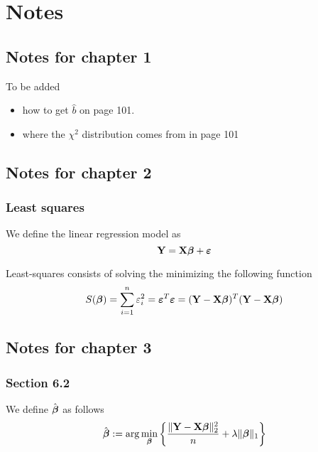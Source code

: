 \chapter{Notes}

\section{Notes for chapter 1}
To be added
\begin{itemize}
    \item how to get $\hat b$ on page 101.
    \item where the $\chi^2$ distribution comes from in page 101
\end{itemize}

\section{Notes for chapter 2}

\subsection{Least squares}

\begin{definition}
    We define the linear regression model as
    \begin{equation}
        \label{eqn: linear model (matrix)}
        \mathbf{Y} = \mathbf{X} \boldsymbol{\beta} + \boldsymbol{\varepsilon}
    \end{equation}
\end{definition}

Least-squares consists of solving the minimizing the following function
\begin{equation}
    \label{eqn: least-squares function}
    S(\boldsymbol{\beta}) = \sum_{i=1}^{n} \varepsilon_{i}^{2} = \boldsymbol{\varepsilon}^{T} \boldsymbol{\varepsilon} = (\mathbf{Y}-\mathbf{X} \boldsymbol{\beta})^{T}(\mathbf{Y}-\mathbf{X} \boldsymbol{\beta})
\end{equation}

\section{Notes for chapter 3}
\subsection{Section 6.2}

We define $\hat {\boldsymbol{\beta}}$ as follows
\begin{equation}
    \label{not: beta hat}
    \hat{\boldsymbol{\beta}}:=\arg \min _{\boldsymbol{\beta}}\left\{\frac{\|\mathbf{Y}-\mathbf{X} \boldsymbol{\beta}\|_{2}^{2}}{n}+\lambda\|\boldsymbol{\beta}\|_{1}\right\}
\end{equation}

